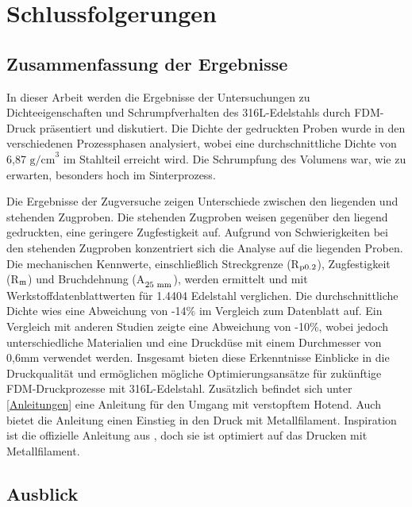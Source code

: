 \chapter{Schlussfolgerungen}
\section{Zusammenfassung der Ergebnisse}

In dieser Arbeit werden die Ergebnisse der Untersuchungen zu Dichteeigenschaften und Schrumpfverhalten des 316L-Edelstahls durch FDM-Druck präsentiert und diskutiert. Die Dichte der gedruckten Proben wurde in den verschiedenen Prozessphasen analysiert, wobei eine durchschnittliche Dichte von 6,87 \(\text{g/cm}^3\) im Stahlteil erreicht wird. Die Schrumpfung des Volumens war, wie zu erwarten, besonders hoch im Sinterprozess.

Die Ergebnisse der Zugversuche zeigen Unterschiede zwischen den liegenden und stehenden Zugproben. Die stehenden Zugproben weisen gegenüber den liegend gedruckten, eine geringere Zugfestigkeit auf. Aufgrund von Schwierigkeiten bei den stehenden Zugproben konzentriert sich die Analyse auf die liegenden Proben. Die mechanischen Kennwerte, einschließlich Streckgrenze (R${\textsubscript{p0.2}}$), Zugfestigkeit (R${\textsubscript{m}}$) und Bruchdehnung (A$_{\textsubscript{25 mm}}$), werden ermittelt und mit Werkstoffdatenblattwerten für 1.4404 Edelstahl verglichen.
Die durchschnittliche Dichte wies eine Abweichung von -14\% im Vergleich zum Datenblatt auf. Ein Vergleich mit anderen Studien zeigte eine Abweichung von -10\%, wobei jedoch unterschiedliche Materialien und eine Druckdüse mit einem Durchmesser von 0,6mm verwendet werden. Insgesamt bieten diese Erkenntnisse Einblicke in die Druckqualität und ermöglichen mögliche Optimierungsansätze für zukünftige FDM-Druckprozesse mit 316L-Edelstahl. Zusätzlich befindet sich unter \autoref{Anleitungen} eine Anleitung für den Umgang mit verstopftem Hotend. Auch bietet die Anleitung einen Einstieg in den Druck mit Metallfilament. Inspiration ist die offizielle Anleitung aus \Autocite{Prusa}, doch sie ist optimiert auf das Drucken mit Metallfilament.

\section{Ausblick}

